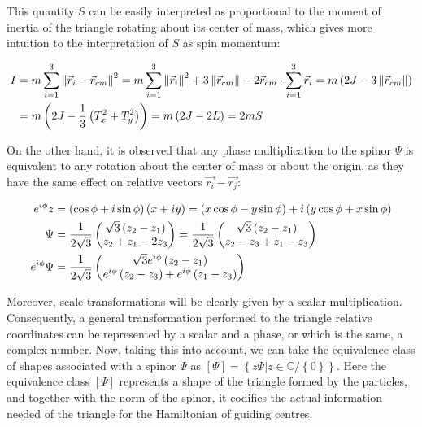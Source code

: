 This quantity $S$ can be easily interpreted as proportional to the moment of inertia of the triangle rotating about its center of mass, which gives more intuition to the interpretation of $S$ as spin momentum:

\begin{align*}
I &= m\sum_{i=1}^3 \left\lVert \vec{r}_i - \vec{r}_{cm} \right\rVert^2 = m\sum_{i=1}^3 \left\lVert \vec{r}_i \right\rVert^2 + 3\left\lVert \vec{r}_{cm} \right\rVert - 2\vec{r}_{cm}\cdot\sum_{i=1}^3\vec{r}_i =m\left( 2J -3\left\lVert \vec{r}_{cm} \right\rVert \right)\\
&= m\left( 2J - \frac{1}{3}\left( T_x^2+T_y^2 \right) \right) = m\left( 2J-2L \right) = 2mS
\end{align*}

On the other hand, it is observed that any phase multiplication to the spinor $\Psi$ is equivalent to any rotation about the center of mass or about the origin, as they have the same effect on relative vectors $\vec{r_i}-\vec{r_j}$:

\begin{align*}
e^{i\phi}z &= \left( \cos{\phi}+i\sin{\phi} \right)\left( x+iy \right) = \left( x\cos{\phi}-y\sin{\phi} \right) + i\left( y\cos{\phi}+x\sin{\phi} \right)\\
\Psi &= \frac{1}{2\sqrt{3}}\begin{pmatrix}\sqrt{3}\left( z_{2}-z_{1} \right)\\
z_{2}+z_{1}-2z_{3}\end{pmatrix}=\frac{1}{2\sqrt{3}}\begin{pmatrix}\sqrt{3}\left( z_{2}-z_{1} \right)\\
z_{2}-z_3+ z_{1}-z_{3}\end{pmatrix}\\
e^{i\phi}\Psi &= \frac{1}{2\sqrt{3}}\begin{pmatrix}\sqrt{3}e^{i\phi}\left( z_{2}-z_{1} \right)\\
e^{i\phi}\left( z_{2}-z_3 \right)+ e^{i\phi}\left( z_{1}-z_{3} \right)\end{pmatrix}
\end{align*}

Moreover, scale transformations will be clearly given by a scalar multiplication. Consequently, a general transformation performed to the triangle relative coordinates can be represented by a scalar and a phase, or which is the same, a complex number. Now, taking this into account, we can take the equivalence class of shapes associated with a spinor $\Psi$ as $\left[ \Psi \right] = \left\{ z\Psi | z \in \mathbb{C} / \left\{ 0 \right\} \right\}$. Here the equivalence class $\left[ \Psi \right]$ represents a shape of the triangle formed by the particles, and together with the norm of the spinor, it codifies the actual information needed of the triangle for the Hamiltonian of guiding centres. 

